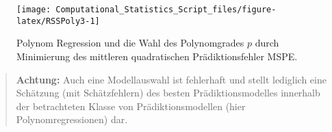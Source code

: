 \documentclass[
  ngerman,
]{book}
\newenvironment{Shaded}{\begin{snugshade}}{\end{snugshade}}
\newcommand{\AttributeTok}[1]{\textcolor[rgb]{0.77,0.63,0.00}{#1}}
\newcommand{\ConstantTok}[1]{\textcolor[rgb]{0.00,0.00,0.00}{#1}}
\newcommand{\ControlFlowTok}[1]{\textcolor[rgb]{0.13,0.29,0.53}{\textbf{#1}}}
\newcommand{\DecValTok}[1]{\textcolor[rgb]{0.00,0.00,0.81}{#1}}
\newcommand{\DocumentationTok}[1]{\textcolor[rgb]{0.56,0.35,0.01}{\textbf{\textit{#1}}}}
\newcommand{\FunctionTok}[1]{\textcolor[rgb]{0.00,0.00,0.00}{#1}}
\newcommand{\NormalTok}[1]{#1}
\newcommand{\OtherTok}[1]{\textcolor[rgb]{0.56,0.35,0.01}{#1}}
\newcommand{\SpecialCharTok}[1]{\textcolor[rgb]{0.00,0.00,0.00}{#1}}
\begin{document}
\begin{Shaded}
\end{Shaded}

\begin{figure}[h]

{\centering \texttt{[image: Computational\_Statistics\_Script\_files/figure-latex/RSSPoly3-1]} 

}

\caption{Polynom Regression und die Wahl des Polynomgrades $p$ durch Minimierung des mittleren quadratischen Prädiktionsfehler MSPE.}\label{fig:RSSPoly3}
\end{figure}

\begin{quote}
\textbf{Achtung:} Auch eine Modellauswahl ist fehlerhaft und stellt lediglich eine Schätzung (mit Schätzfehlern) des besten Prädiktionsmodelles innerhalb der betrachteten Klasse von Prädiktionsmodellen (hier Polynomregressionen) dar.
\end{quote}
\end{document}
